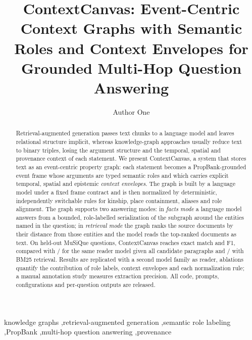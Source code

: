 \documentclass[preprint,12pt,authoryear]{elsarticle}
\begin{document}
\begin{frontmatter}

\title{ContextCanvas: Event-Centric Context Graphs with Semantic Roles and Context Envelopes for Grounded Multi-Hop Question Answering}

\author[inst1]{Author One}

\begin{abstract}
Retrieval-augmented generation passes text chunks to a language model and leaves relational structure implicit, whereas knowledge-graph approaches usually reduce text to binary triples, losing the argument structure and the temporal, spatial and provenance context of each statement.
We present ContextCanvas, a system that stores text as an event-centric property graph: each statement becomes a PropBank-grounded event frame whose arguments are typed semantic roles and which carries explicit temporal, spatial and epistemic \emph{context envelopes}.
The graph is built by a language model under a fixed frame contract and is then normalized by deterministic, independently switchable rules for kinship, place containment, aliases and role alignment.
The graph supports two answering modes: in \emph{facts mode} a language model answers from a bounded, role-labelled serialization of the subgraph around the entities named in the question; in \emph{retrieval mode} the graph ranks the source documents by their distance from those entities and the model reads the top-ranked documents as text.
On \ResNTest{} held-out MuSiQue questions, ContextCanvas reaches \ResCCEM{} exact match and \ResCCFOne{} F1, compared with \ResFullEM{} / \ResFullFOne{} for the same reader model given all candidate paragraphs and \ResBMfiveEM{} / \ResBMfiveFOne{} with BM25 retrieval.
Results are replicated with a second model family as reader, ablations quantify the contribution of role labels, context envelopes and each normalization rule; a manual annotation study measures extraction precision.
All code, prompts, configurations and per-question outputs are released.
\end{abstract}

\begin{keyword}
knowledge graphs \sep retrieval-augmented generation \sep semantic role labeling \sep PropBank \sep multi-hop question answering \sep provenance
\end{keyword}

\end{frontmatter}
\end{document}
